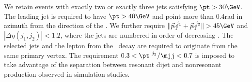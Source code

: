 We retain events with exactly two or exactly three jets satisfying
$\pt > 30\GeV$.  The leading jet is required to have $\pt > 40\GeV$
and point more than 0.4\unit{rad} in azimuth from the direction of the
\met.  We further require $\|\vec{p}_{\text{T}}^{~j_1}
+\vec{p}_{\text{T}}^{~j_2}\| > 45\GeV$ and $|\Delta\eta(j_1,j_2)| <
1.2$, where the jets are numbered in order of decreasing \pt.  The
selected jets and the lepton from the \PW\ decay are required to
originate from the same primary vertex.  The requirement $0.3 <
\pt^{~j_2}/\mjj < 0.7$ is imposed to take advantage of the separation
between resonant dijet and nonresonant
\Wpj production observed in simulation studies.



